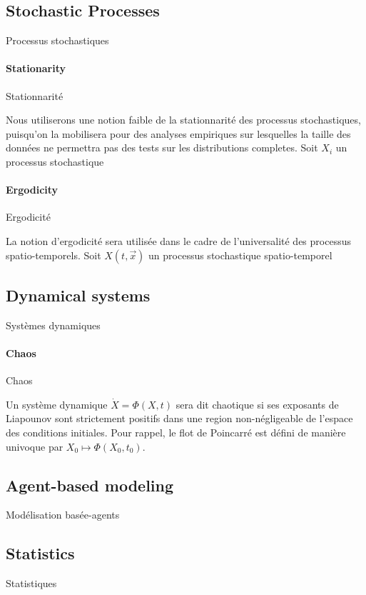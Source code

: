 \subsection*{Stochastic Processes}{Processus stochastiques}

\paragraph{Stationarity}{Stationnarité}

Nous utiliserons une notion faible de la stationnarité des processus stochastiques, puisqu'on la mobilisera pour des analyses empiriques sur lesquelles la taille des données ne permettra pas des tests sur les distributions completes. Soit $X_i$ un processus stochastique


\paragraph{Ergodicity}{Ergodicité}

La notion d'ergodicité sera utilisée dans le cadre de l'universalité des processus spatio-temporels. Soit $X(t,\vec{x})$ un processus stochastique spatio-temporel



\subsection*{Dynamical systems}{Systèmes dynamiques}

\paragraph{Chaos}{Chaos}


Un système dynamique $\dot{X}=\Phi(X,t)$ sera dit chaotique si ses exposants de Liapounov sont strictement positifs dans une region non-négligeable de l'espace des conditions initiales. Pour rappel, le flot de Poincarré est défini de manière univoque par $X_0 \mapsto \Phi(X_0,t_0)$.


\subsection*{Agent-based modeling}{Modélisation basée-agents}





\subsection*{Statistics}{Statistiques}


